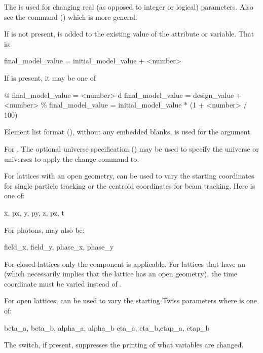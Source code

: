 \vskip 10pt 

The  is used for changing real (as opposed to integer or logical)
parameters. Also see the  command () which is more general.

If  is not present,  is added to the existing value
of the attribute or variable. That is:
\begin{example}
  final_model_value = initial_model_value + <number>
\end{example}
If  is present, it may be one of
\begin{example}
  @       final_model_value = <number>
  d       final_model_value = design_value + <number>
  \%       final_model_value = initial_model_value * (1 + <number> / 100)
\end{example}

Element list format (), without any embedded blanks, is used for
the  argument.

For , The optional  universe specification
() may be used to specify the universe or universes to apply the change
command to.

For lattices with an open geometry,  can be
used to vary the starting coordinates for single particle tracking or the centroid
coordinates for beam tracking. Here  is one of:
\begin{example}
  x, px, y, py, z, pz, t
\end{example}
For photons,  may also be:
\begin{example}
  field_x, field_y, phase_x, phase_y
\end{example}
For closed lattices only the  component is applicable. For lattices that have an
 (which necessarily implies that the lattice has an open geometry), the time
 coordinate must be varied instead of .

For open lattices,  can be used to vary the starting
Twiss parameters where  is one of:
\begin{example}
  beta_a, beta_b, alpha_a, alpha_b 
  eta_a, eta_b,etap_a, etap_b    
\end{example}

The  switch, if present, suppresses the printing of what variables are
changed.

